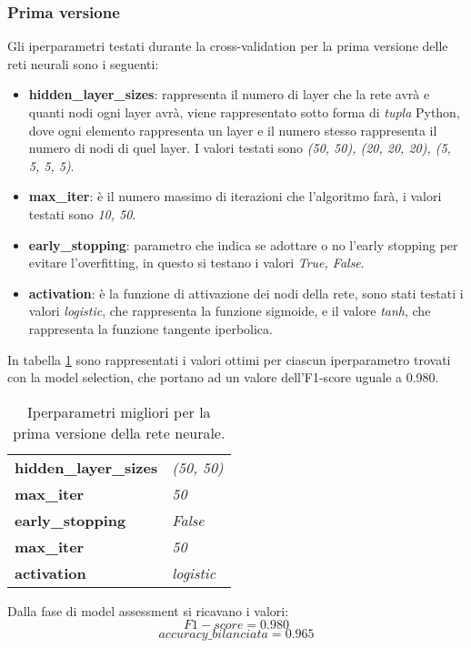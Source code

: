 \subsubsection{Prima versione}\label{nnv1}
Gli iperparametri testati durante la cross-validation per la prima versione delle reti neurali sono i seguenti:
\begin{itemize}
\item \textbf{hidden\_layer\_sizes}: rappresenta il numero di layer che la rete avrà e quanti nodi ogni layer avrà, viene rappresentato sotto forma di \textit{tupla} Python, dove ogni elemento rappresenta un layer e il numero stesso rappresenta il numero di nodi di quel layer. I valori testati sono \textit{(50, 50), (20, 20, 20), (5, 5, 5, 5)}.
\item \textbf{max\_iter}: è il numero massimo di iterazioni che l'algoritmo farà, i valori testati sono \textit{10, 50}.
\item \textbf{early\_stopping}: parametro che indica se adottare o no l'early stopping per evitare l'overfitting, in questo si testano i valori \textit{True, False}.
\item \textbf{activation}: è la funzione di attivazione dei nodi della rete, sono stati testati i valori \textit{logistic}, che rappresenta la funzione sigmoide, e il valore \textit{tanh}, che rappresenta la funzione tangente iperbolica.
\end{itemize}

In tabella \ref{tab:nnv1} sono rappresentati i valori ottimi per ciascun iperparametro trovati con la model selection, che portano ad un valore dell'F1-score uguale a 0.980.

\begin{table}[h] 
\centering
\begin{tabular}{l l}
\hline
\textbf{hidden\_layer\_sizes} & \textit{(50, 50)}\\
\textbf{max\_iter} & \textit{50}\\
\textbf{early\_stopping} & \textit{False}\\
\textbf{max\_iter} & \textit{50}\\
\textbf{activation} & \textit{logistic}\\
\hline
\end{tabular}
\caption{Iperparametri migliori per la prima versione della rete neurale.}
\label{tab:nnv1}
\end{table}

Dalla fase di model assessment si ricavano i valori:
$$F1-score = 0.980$$
$$accuracy\_bilanciata = 0.965$$

